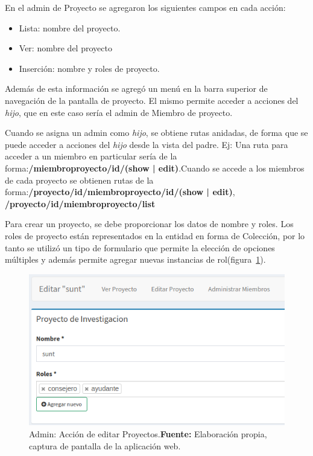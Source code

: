 En el admin de Proyecto se agregaron los siguientes campos en cada acción:

\begin{itemize}
    \item Lista: nombre del proyecto.
    \item Ver: nombre del proyecto
    \item Inserción: nombre y roles de proyecto.
\end{itemize}

Además de esta información se agregó un menú en la barra superior de navegación de la pantalla de proyecto. El mismo permite acceder a acciones del \textit{hijo},
que en este caso sería el admin de Miembro de proyecto.

Cuando se asigna un admin como \textit{hijo}, se obtiene rutas anidadas, de forma que se puede acceder a acciones del \textit{hijo} desde la vista del padre. Ej: Una ruta
para acceder a un miembro en particular sería de la forma:\newline \textbf{/miembroproyecto/{id}/(show | edit)}\@.\newline\newline Cuando se accede a los miembros de cada proyecto se obtienen rutas de la forma:\newline \textbf{/proyecto/{id}/miembroproyecto/{id}/(show | edit)},
\newline \textbf{/proyecto/{id}/miembroproyecto/list}\newline

Para crear un proyecto, se debe proporcionar los datos de nombre y roles. Los roles de proyecto están representados en la entidad en forma de Colección,
por lo tanto se utilizó un tipo de formulario que permite la elección de opciones múltiples y además permite agregar nuevas instancias de
rol(figura~\ref{fig:image/proyecto-editar}).

\begin{figure}[h]
    \includegraphics[width=1\linewidth]{image/proyecto-editar.png}
    \caption{Admin: Acción de  editar Proyectos.\newline \textbf{Fuente:} Elaboración propia, captura de pantalla de la aplicación web.}
    \label{fig:image/proyecto-editar}
\end{figure}

